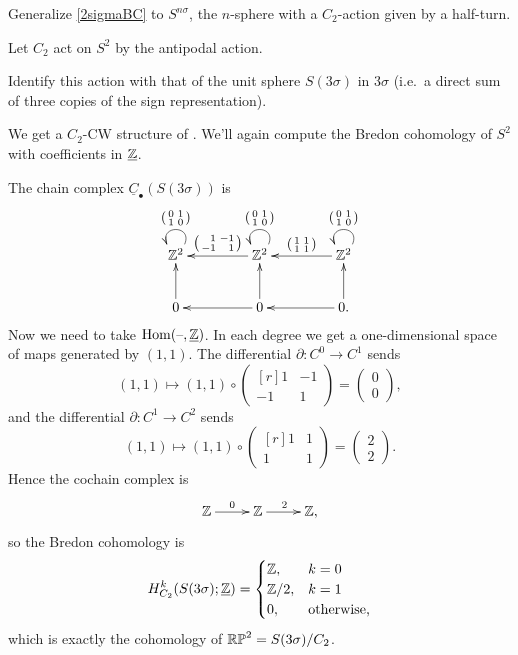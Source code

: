 \begin{ex}
Generalize \cref{2sigmaBC} to $S^{n\sigma}$, the $n$-sphere with a $C_2$-action given by a half-turn.
\end{ex}
\begin{exm}
Let $C_2$ act on $S^2$ by the antipodal action.
\begin{ex}
Identify this action with that of the unit sphere $S(3\sigma)$ in $3\sigma$ (i.e.\ a direct sum of three copies of
the sign representation).
\end{ex}

We get a $C_2$-CW structure of \TODO. We'll again compute the
Bredon cohomology of $S^2$ with coefficients in $\underline{\mathbb Z}$.

The chain complex $\underline C_\bullet(S(3\sigma))$ is
\[\xymatrix@C=1.5cm{
	\Z^2\ar@(ur,ul)_{\begin{psmallmatrix}0&1\\1&0\end{psmallmatrix}} &
	\Z^2\ar[l]_{\begin{psmallmatrix*}[r]1&-1\\-1&1\end{psmallmatrix*}}
	\ar@(ur,ul)_{\begin{psmallmatrix}0&1\\1&0\end{psmallmatrix}} &
	\Z^2\ar[l]_{\begin{psmallmatrix}1&1\\1&1\end{psmallmatrix}}
	\ar@(ur,ul)_{\begin{psmallmatrix}0&1\\1&0\end{psmallmatrix}}\\
	0\ar[u] & 0\ar[u]\ar[l] & 0.\ar[u]\ar[l]
}\]
Now we need to take $\operatorname{Hom}(\text{--},\underline{\mathbb Z})$. In each degree we get a one-dimensional space of maps generated by
$(1,1)$. The differential $\partial\colon C^0\to C^1$ sends
\[(1,1)\mapsto (1,1)\circ\begin{pmatrix*}[r]1 & -1\\-1 & 1\end{pmatrix*} = \begin{pmatrix}0\\0\end{pmatrix},\]
and the differential $\partial\colon C^1\to C^2$ sends
\[(1,1)\mapsto (1,1)\circ\begin{pmatrix*}[r]1 & 1\\1 & 1\end{pmatrix*} = \begin{pmatrix}2\\2\end{pmatrix}.\]
Hence the cochain complex is
\[\xymatrix{
	\Z\ar[r]^0 & \Z\ar[r]^2 & \Z,
}\]
so the Bredon cohomology is
\[H_{C_2}^k(S(3\sigma);\underline{\mathbb Z}) = \begin{cases}
	\mathbb Z, &k = 0\\
	\mathbb Z/2, &k = 1\\
	0, &\text{otherwise,}
\end{cases}\]
which is exactly the cohomology of $\mathbb{RP}^2 = S(3\sigma)/C_2$.
\end{exm}

